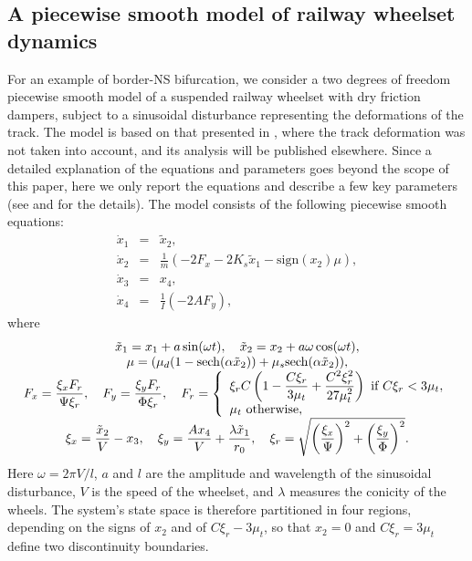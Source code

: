 \documentclass[final,onefignum]{siamltex}
\begin{document}
\subsection*{A piecewise smooth model of railway wheelset dynamics}
\label{sec:ex3}
For an example of border-NS bifurcation, we consider a two degrees of freedom piecewise smooth model of a suspended railway wheelset with dry friction dampers, subject to a sinusoidal disturbance representing the deformations of the track.  The model is based on that presented in \citep{True03, Knudsen92}, where the track deformation was not taken into account, and its analysis will be published elsewhere.  Since a detailed explanation of the equations and parameters  goes beyond the scope of this paper, here we only report the equations and describe a few key parameters (see \citep{Knudsen92} and \citep{True03} for the details).   The model consists of the following piecewise smooth equations:
$$
\begin{array}{rcl}
 \dot{x}_1 & = & \tilde{x}_2,\\
 \dot{x}_2 & = & {\displaystyle \frac{\displaystyle {1}}{\displaystyle {m}}}(-2F_x-2K_s \tilde{x}_1-	\mbox{sign}(x_2)\mu),\\
 \dot{x}_3 & = & x_4,\\
 \dot{x}_4 & = & {\displaystyle \frac{\displaystyle {1}}{\displaystyle {I}}}(-2AF_y),
\end{array}
$$
where
$$
\begin{array}{c}
\tilde{x}_1=x_1+a\sin(\omega t),\quad \tilde{x}_2=x_2+a\omega\cos(\omega t),\\ \mu=(\mu_d(1-{ {\rm sech} }(\alpha \tilde{x}_2)) + \mu_s { {\rm sech} }(\alpha \tilde{x}_2)),\\
F_x={\displaystyle \frac{\displaystyle {\xi_x F_r}}{\displaystyle {\Psi \xi_r}}}, \quad F_y={\displaystyle \frac{\displaystyle {\xi_y F_r}}{\displaystyle {\Phi \xi_r}}},\quad F_r=
\left\{\begin{array}{l}
\xi_r C\left(1-{\displaystyle \frac{\displaystyle {C \xi_r}}{\displaystyle {3 \mu_t}}} + {\displaystyle \frac{\displaystyle {C^2 \xi^2_r}}{\displaystyle {27 \mu^2_t}}}\right)\mbox{ if $C\xi_r<3\mu_t$},\\
\mu_t \mbox{ otherwise,}\\
\end{array}\right.\\
\xi_x={\displaystyle \frac{\displaystyle {\tilde{x}_2}}{\displaystyle {V}}}-x_3, \quad \xi_y={\displaystyle \frac{\displaystyle {Ax_4}}{\displaystyle {V}}}+{\displaystyle \frac{\displaystyle {\lambda \tilde{x}_1}}{\displaystyle {r_0}}}, \quad \xi_r=\sqrt{\left({\displaystyle \frac{\displaystyle {\xi_x}}{\displaystyle {\Psi}}}\right)^2 + \left({\displaystyle \frac{\displaystyle {\xi_y}}{\displaystyle {\Phi}}}\right)^2}.
\end{array}
$$
Here $\omega=2\pi V/l$, $a$ and $l$ are the amplitude and wavelength of the sinusoidal disturbance, $V$ is the speed of the wheelset, and $\lambda$ measures the conicity of the wheels. The system's state space is therefore partitioned in four regions, depending on the signs of $x_2$ and of $C\xi_r-3\mu_t$, so that $x_2=0$ and $C\xi_r=3\mu_t$ define two discontinuity boundaries.  
\end{document}
